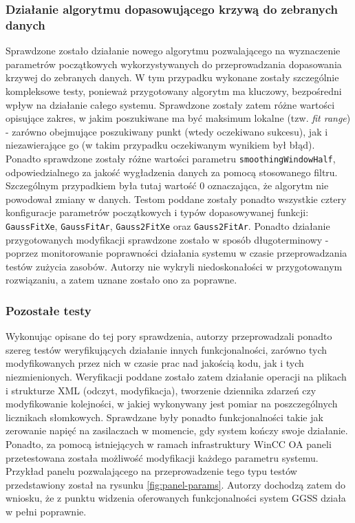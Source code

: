 \subsubsection*{Działanie algorytmu dopasowującego krzywą do zebranych danych}
Sprawdzone zostało działanie nowego algorytmu pozwalającego na wyznaczenie parametrów początkowych wykorzystywanych do przeprowadzania dopasowania krzywej do zebranych danych. W tym przypadku wykonane zostały szczególnie kompleksowe testy, ponieważ przygotowany algorytm ma kluczowy, bezpośredni wpływ na działanie całego systemu. Sprawdzone zostały zatem różne wartości opisujące zakres, w jakim poszukiwane ma być maksimum lokalne (tzw. \emph{fit range}) - zarówno obejmujące poszukiwany punkt (wtedy oczekiwano sukcesu), jak i niezawierające go (w takim przypadku oczekiwanym wynikiem był błąd). Ponadto sprawdzone zostały różne wartości parametru \lstinline{smoothingWindowHalf}, odpowiedzialnego za jakość wygładzenia danych za pomocą stosowanego filtru. Szczególnym przypadkiem była tutaj wartość 0 oznaczająca, że algorytm nie powodował zmiany w danych. Testom poddane zostały ponadto wszystkie cztery konfiguracje parametrów początkowych i typów dopasowywanej funkcji: \lstinline{GaussFitXe}, \lstinline{GaussFitAr}, \lstinline{Gauss2FitXe} oraz \lstinline{Gauss2FitAr}. Ponadto działanie przygotowanych modyfikacji sprawdzone zostało w sposób długoterminowy - poprzez monitorowanie poprawności działania systemu w czasie przeprowadzania testów zużycia zasobów. Autorzy nie wykryli niedoskonałości w przygotowanym rozwiązaniu, a zatem uznane zostało ono za poprawne.

\subsubsection*{Pozostałe testy}
Wykonując opisane do tej pory sprawdzenia, autorzy przeprowadzali ponadto szereg testów weryfikujących działanie innych funkcjonalności, zarówno tych modyfikowanych przez nich w czasie prac nad jakością kodu, jak i tych niezmienionych. Weryfikacji poddane zostało zatem działanie operacji na plikach i strukturze XML (odczyt, modyfikacja), tworzenie dziennika zdarzeń czy modyfikowanie kolejności, w jakiej wykonywany jest pomiar na poszczególnych licznikach słomkowych. Sprawdzane były ponadto funkcjonalności takie jak zerowanie napięć na zasilaczach w momencie, gdy system kończy swoje działanie. Ponadto, za pomocą istniejących w ramach infrastruktury WinCC OA paneli przetestowana została możliwość modyfikacji każdego parametru systemu. Przykład panelu pozwalającego na przeprowadzenie tego typu testów przedstawiony został na rysunku \ref{fig:panel-params}. Autorzy dochodzą zatem do wniosku, że z punktu widzenia oferowanych funkcjonalności system GGSS działa w pełni poprawnie.

